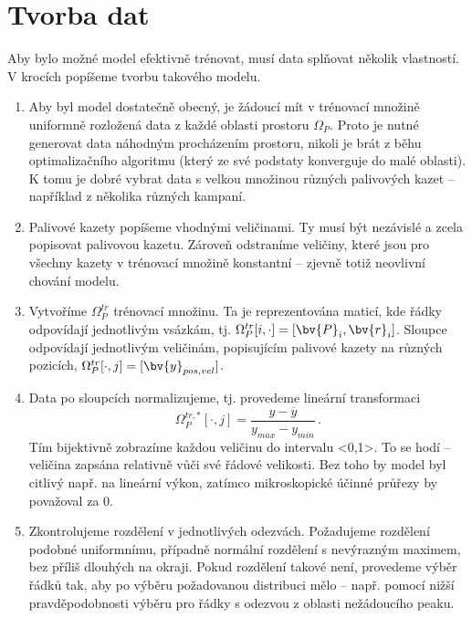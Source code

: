 \section{Tvorba dat}
Aby bylo možné model efektivně trénovat, musí data splňovat několik vlastností. V krocích popíšeme 
tvorbu takového modelu.
\begin{enumerate}
	\item Aby byl model dostatečně obecný, je žádoucí mít v trénovací množině uniformně rozložená data z každé oblasti 
		prostoru $\Omega_P$. Proto je nutné generovat data náhodným procházením prostoru, nikoli je brát z běhu 
		optimalizačního algoritmu (který ze své podstaty konverguje do malé oblasti). K tomu je dobré vybrat data 
		s velkou množinou různých palivových kazet -- například z několika různých kampaní.


	\item Palivové kazety popíšeme vhodnými veličinami. Ty musí být nezávislé a zcela popisovat palivovou kazetu. 
		Zároveň odstraníme veličiny, které jsou pro všechny kazety v trénovací množině konstantní -- zjevně totiž 
		neovlivní chování modelu. 
	
	\item Vytvoříme $\Omega_P^{tr}$ trénovací množinu. Ta je reprezentována maticí, kde řádky odpovídají jednotlivým 
		vsázkám, tj. $\Omega_P^{tr} [i,\cdot] = [\bv{P}_i, \bv{r}_i]$. Sloupce odpovídají jednotlivým veličinám, 
		popisujícím palivové kazety na různých pozicích, $\Omega_P^{tr} [\cdot, j] = [\bv{y}_{pos, vel}]$. 

	\item Data po sloupcích normalizujeme, tj. provedeme lineární transformaci 
		\begin{equation}
			\Omega_P^{tr,\ast} [\cdot,j] = \frac{y - \overline{y}}{y_{max} - y_{min}} \,.
		\end{equation}
		Tím bijektivně zobrazíme každou veličinu do intervalu <0,1>. To se hodí -- veličina zapsána relativně 
		vůči své řádové velikosti. Bez toho by model byl citlivý např. na lineární výkon, zatímco mikroskopické účinné 
		průřezy by považoval za 0. 

	\item Zkontrolujeme rozdělení v jednotlivých odezvách. Požadujeme rozdělení podobné uniformnímu, případně 
		normální rozdělení s nevýrazným maximem, bez příliš dlouhých  na okraji. Pokud rozdělení takové není, 
		provedeme výběr řádků tak, aby po výběru požadovanou distribuci mělo -- např. pomocí nižší pravděpodobnosti 
		výběru pro řádky s odezvou z oblasti nežádoucího peaku. 


\end{enumerate}
